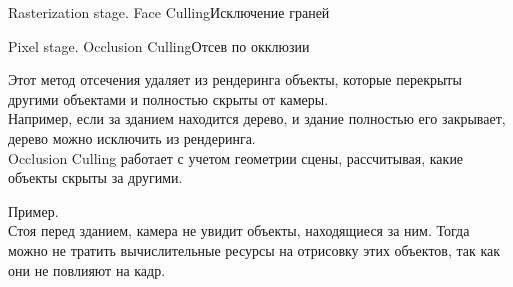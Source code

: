 \documentclass{beamer}
\begin{document}
\begin{frame}{Rasterization stage. Face Culling}{Исключение граней}
{		}

	\end{frame}

	\begin{frame}{Pixel stage. Occlusion Culling}{Отсев по окклюзии}

Этот метод отсечения удаляет из рендеринга объекты, которые перекрыты другими объектами и полностью скрыты от камеры. 
\\
Например, если за зданием находится дерево, и здание полностью его закрывает, дерево можно исключить из рендеринга. 
\\
Occlusion Culling работает с учетом геометрии сцены, рассчитывая, какие объекты скрыты за другими.

\vspace{0.5cm}
Пример. \\
Стоя перед зданием, камера не увидит объекты, находящиеся за ним. Тогда можно не тратить вычислительные ресурсы на отрисовку этих объектов, так как они не повлияют на кадр.


	\end{frame}
\end{document}

